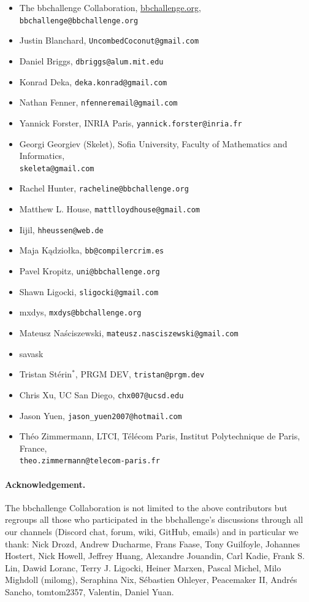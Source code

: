 \documentclass[a4paper,british]{article}
\theoremstyle{definition} %
\numberwithin{equation}{section}
\theoremstyle{definition} %
\begin{document}
\begin{itemize}
    \item The bbchallenge Collaboration, \url{bbchallenge.org}, \texttt{bbchallenge@bbchallenge.org}
    \item Justin Blanchard, \texttt{UncombedCoconut@gmail.com}
    \item Daniel Briggs, \texttt{dbriggs@alum.mit.edu}
    \item Konrad Deka, \texttt{deka.konrad@gmail.com}
    \item Nathan Fenner, \texttt{nfenneremail@gmail.com}
    \item Yannick Forster, INRIA Paris, \texttt{yannick.forster@inria.fr}
    \item Georgi Georgiev (Skelet), Sofia University, Faculty of Mathematics and Informatics,\\\texttt{skeleta@gmail.com}
    \item Rachel Hunter, \texttt{racheline@bbchallenge.org}
    \item Matthew L. House, \texttt{mattlloydhouse@gmail.com}
    \item Iijil, \texttt{hheussen@web.de}
    \item Maja Kądziołka, \texttt{bb@compilercrim.es}
    \item Pavel Kropitz, \texttt{uni@bbchallenge.org}
    \item Shawn Ligocki, \texttt{sligocki@gmail.com}
    \item mxdys, \texttt{mxdys@bbchallenge.org}
    \item Mateusz Na\'{s}ciszewski, \texttt{mateusz.nasciszewski@gmail.com}
    \item savask
    \item Tristan Stérin$^{\ast}$, PRGM DEV, \texttt{tristan@prgm.dev}
    \item Chris Xu, UC San Diego, \texttt{chx007@ucsd.edu}
    \item Jason Yuen, \texttt{jason\_yuen2007@hotmail.com}
    \item Théo Zimmermann, LTCI, Télécom Paris, Institut Polytechnique de Paris, France, \\ \texttt{theo.zimmermann@telecom-paris.fr}
\end{itemize}



\paragraph{Acknowledgement.} The bbchallenge Collaboration is not limited to the above contributors but regroups all those who participated in the bbchallenge's discussions through all our channels (Discord chat, forum, wiki, GitHub, emails) and in particular we thank:  Nick Drozd, Andrew Ducharme, Frans Faase, Tony Guilfoyle, Johannes Hostert, Nick Howell, Jeffrey Huang, Alexandre Jouandin, Carl Kadie, Frank S. Lin, Dawid Loranc, Terry J. Ligocki, Heiner Marxen, Pascal Michel, Milo Mighdoll (milomg), Seraphina Nix, Sébastien Ohleyer, Peacemaker II, Andrés Sancho, tomtom2357, Valentin, Daniel Yuan.
\end{document}
